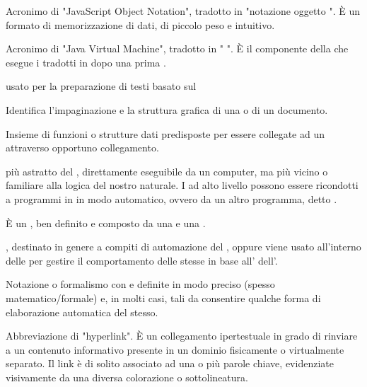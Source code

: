 {Acronimo di "JavaScript Object Notation", tradotto in "notazione oggetto ". \`{E} un formato di memorizzazione di dati, di piccolo peso e intuitivo.}


{Acronimo di "Java Virtual Machine", tradotto in " ". \`{E} il componente della  che esegue i  tradotti in  dopo una prima .}



{ usato per la preparazione di testi basato sul  }


{Identifica l'impaginazione e la struttura grafica di una  o di un documento.}


{Insieme di funzioni o strutture dati predisposte per essere collegate ad un   attraverso opportuno collegamento.}


{ più astratto del , direttamente eseguibile da un computer, ma più vicino o familiare alla logica del nostro  naturale. I  ad alto livello possono essere ricondotti a programmi in  in modo automatico, ovvero da un altro programma, detto .}


{\`{E} un , ben definito e composto da una  e una .}


{, destinato in genere a compiti di automazione del , oppure viene usato all'interno delle  per gestire il comportamento delle  stesse in base all'  dell'.}


{Notazione o formalismo con  e  definite in modo preciso (spesso matematico/formale) e, in molti casi, tali da consentire qualche forma di elaborazione automatica del  stesso.}


{Abbreviazione di "hyperlink". \`{E} un collegamento ipertestuale in grado di rinviare a un contenuto informativo presente in un dominio fisicamente o virtualmente separato. Il link è di solito associato ad una o più parole chiave, evidenziate visivamente da una diversa colorazione o sottolineatura.}


